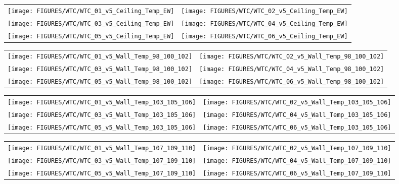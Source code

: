 \begin{figure}[p]
\begin{tabular*}{\textwidth}{l@{\extracolsep{\fill}}r}
\texttt{[image: FIGURES/WTC/WTC\_01\_v5\_Ceiling\_Temp\_EW]} &
\texttt{[image: FIGURES/WTC/WTC\_02\_v5\_Ceiling\_Temp\_EW]} \\
\texttt{[image: FIGURES/WTC/WTC\_03\_v5\_Ceiling\_Temp\_EW]} &
\texttt{[image: FIGURES/WTC/WTC\_04\_v5\_Ceiling\_Temp\_EW]} \\
\texttt{[image: FIGURES/WTC/WTC\_05\_v5\_Ceiling\_Temp\_EW]} &
\texttt{[image: FIGURES/WTC/WTC\_06\_v5\_Ceiling\_Temp\_EW]}
\end{tabular*}
\label{NIST_WTC_Ceiling_EW}
\end{figure}

\begin{figure}[p]
\begin{tabular*}{\textwidth}{l@{\extracolsep{\fill}}r}
\texttt{[image: FIGURES/WTC/WTC\_01\_v5\_Wall\_Temp\_98\_100\_102]} &
\texttt{[image: FIGURES/WTC/WTC\_02\_v5\_Wall\_Temp\_98\_100\_102]} \\
\texttt{[image: FIGURES/WTC/WTC\_03\_v5\_Wall\_Temp\_98\_100\_102]} &
\texttt{[image: FIGURES/WTC/WTC\_04\_v5\_Wall\_Temp\_98\_100\_102]} \\
\texttt{[image: FIGURES/WTC/WTC\_05\_v5\_Wall\_Temp\_98\_100\_102]} &
\texttt{[image: FIGURES/WTC/WTC\_06\_v5\_Wall\_Temp\_98\_100\_102]}
\end{tabular*}
\label{NIST_WTC_Wall_98_100_102}
\end{figure}

\begin{figure}[p]
\begin{tabular*}{\textwidth}{l@{\extracolsep{\fill}}r}
\texttt{[image: FIGURES/WTC/WTC\_01\_v5\_Wall\_Temp\_103\_105\_106]} &
\texttt{[image: FIGURES/WTC/WTC\_02\_v5\_Wall\_Temp\_103\_105\_106]} \\
\texttt{[image: FIGURES/WTC/WTC\_03\_v5\_Wall\_Temp\_103\_105\_106]} &
\texttt{[image: FIGURES/WTC/WTC\_04\_v5\_Wall\_Temp\_103\_105\_106]} \\
\texttt{[image: FIGURES/WTC/WTC\_05\_v5\_Wall\_Temp\_103\_105\_106]} &
\texttt{[image: FIGURES/WTC/WTC\_06\_v5\_Wall\_Temp\_103\_105\_106]}
\end{tabular*}
\label{NIST_WTC_Wall_103_105_106}
\end{figure}

\begin{figure}[p]
\begin{tabular*}{\textwidth}{l@{\extracolsep{\fill}}r}
\texttt{[image: FIGURES/WTC/WTC\_01\_v5\_Wall\_Temp\_107\_109\_110]} &
\texttt{[image: FIGURES/WTC/WTC\_02\_v5\_Wall\_Temp\_107\_109\_110]} \\
\texttt{[image: FIGURES/WTC/WTC\_03\_v5\_Wall\_Temp\_107\_109\_110]} &
\texttt{[image: FIGURES/WTC/WTC\_04\_v5\_Wall\_Temp\_107\_109\_110]} \\
\texttt{[image: FIGURES/WTC/WTC\_05\_v5\_Wall\_Temp\_107\_109\_110]} &
\texttt{[image: FIGURES/WTC/WTC\_06\_v5\_Wall\_Temp\_107\_109\_110]}
\end{tabular*}
\label{NIST_WTC_Wall_107_109_110}
\end{figure}

